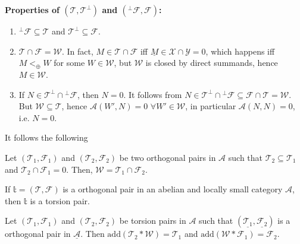 \sepline

\bf Properties of $(\mathcal{T},\mathcal{T}^\perp)$ and $(^\perp\mathcal{F},\mathcal{F})$: \rm
\begin{enumerate}
  \item $^\perp\mathcal{F}\subseteq\mathcal{T}$ and $\mathcal{T}^\perp\subseteq \mathcal{F}$.
  \item $\mathcal{T}\cap\mathcal{F} = \mathcal{W}$.
  In fact, $M\in\mathcal{T}\cap\mathcal{F}$ iff $\underline{M}\in\mathcal{X}\cap\mathcal{Y}=0$, which happens iff $M<_\oplus W$ for some $W\in\mathcal{W}$,
  but $\mathcal{W}$ is closed by direct summands, hence $M\in\mathcal{W}$.
  \item If $N\in\mathcal{T}^\perp \cap{^\perp\mathcal{F}}$, then $N=0$. It follows from $N\in\mathcal{T}^\perp \cap{^\perp\mathcal{F}}\subseteq\mathcal{F}\cap\mathcal{T}=\mathcal{W}$. But $\mathcal{W}\subseteq\mathcal{T}$, hence $\mathcal{A}(W',N)=0$ $\forall W'\in\mathcal{W}$,
  in particular $\mathcal{A}(N,N)=0$, i.e. $N=0$.
\end{enumerate}

It follows the following
\begin{lemma}
  Let $(\mathcal{T}_1,\mathcal{F}_1)$ and $(\mathcal{T}_2,\mathcal{F}_2)$ be two orthogonal pairs in $\mathcal{A}$ such that $\mathcal{T}_2\subseteq \mathcal{T}_1$ and $\mathcal{T}_2\cap \mathcal{F}_1=0$. Then, $\mathcal{W}=\mathcal{T}_1\cap\mathcal{F}_2$.
\end{lemma}

\sepline

If $\mathbb{t}=(\mathcal{T},\mathcal{F})$ is a orthogonal pair in an abelian and locally small category $\mathcal{A}$, then $\mathbb{t}$ is a torsion pair.

\sepline

\begin{lemma}
  Let $(\mathcal{T}_1,\mathcal{F}_1)$ and $(\mathcal{T}_2,\mathcal{F}_2)$ be torsion pairs in $\mathcal{A}$ such that $(\underline{\mathcal{T}_1},\underline{\mathcal{F}_2})$ is a orthogonal pair in $\underline{\mathcal{A}}$. Then $\mathrm{add}(\mathcal{T}_2\ast \mathcal{W}) = \mathcal{T}_1$ and $\mathrm{add}(\mathcal{W}\ast\mathcal{F}_1) = \mathcal{F}_2$.
\end{lemma}

